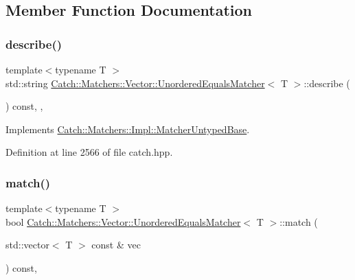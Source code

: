 \subsection{Member Function Documentation}
\mbox{\label{struct_catch_1_1_matchers_1_1_vector_1_1_unordered_equals_matcher_a7202d811200317abc58c844f663823df}} 
\subsubsection{\texorpdfstring{describe()}{describe()}}
{\footnotesize\ttfamily template$<$typename T $>$ \\
std\+::string \mbox{\hyperlink{struct_catch_1_1_matchers_1_1_vector_1_1_unordered_equals_matcher}{Catch\+::\+Matchers\+::\+Vector\+::\+Unordered\+Equals\+Matcher}}$<$ T $>$\+::describe (\begin{DoxyParamCaption}{ }\end{DoxyParamCaption}) const\hspace{0.3cm}{\ttfamily [inline]}, {\ttfamily [override]}, {\ttfamily [virtual]}}



Implements \mbox{\hyperlink{class_catch_1_1_matchers_1_1_impl_1_1_matcher_untyped_base_a91d3a907dbfcbb596077df24f6e11fe2}{Catch\+::\+Matchers\+::\+Impl\+::\+Matcher\+Untyped\+Base}}.



Definition at line 2566 of file catch.\+hpp.

\mbox{\label{struct_catch_1_1_matchers_1_1_vector_1_1_unordered_equals_matcher_a3ccdd9dd2cd8bdbb8bb121acbb9cb358}} 
\subsubsection{\texorpdfstring{match()}{match()}}
{\footnotesize\ttfamily template$<$typename T $>$ \\
bool \mbox{\hyperlink{struct_catch_1_1_matchers_1_1_vector_1_1_unordered_equals_matcher}{Catch\+::\+Matchers\+::\+Vector\+::\+Unordered\+Equals\+Matcher}}$<$ T $>$\+::match (\begin{DoxyParamCaption}\item[{std\+::vector$<$ T $>$ const \&}]{vec }\end{DoxyParamCaption}) const\hspace{0.3cm}{\ttfamily [inline]}, {\ttfamily [override]}}



